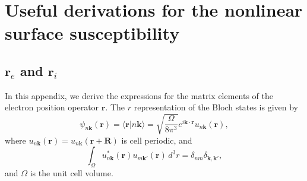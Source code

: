 \chapter{Useful derivations for the nonlinear surface susceptibility}
\label{app:chi2deriv}
\partialtoc



\section{\texorpdfstring{$\mathbf{r}_{e}$ and $\mathbf{r}_{i}$}{re and ri}}
\label{app:re_ri}

In this appendix, we derive the expressions for the matrix elements of the
electron position operator $\mathbf{r}$. The $r$ representation of the Bloch
states is given by
\begin{equation}\label{bloch}
\psi_{n\mathbf{k}}(\mathbf{r})=\langle\mathbf{r}\vert n\mathbf{k}\rangle =
\sqrt{\frac{\Omega}{8\pi^{3}}}
e^{i\mathbf{k} \cdot \mathbf{r}}u_{n\mathbf{k}}(\mathbf{r}),
\end{equation}
where $u_{n\mathbf{k}}(\mathbf{r}) = u_{n\mathbf{k}}(\mathbf{r} + \mathbf{R})$
is cell periodic, and
\begin{equation}\label{normal}
\int_{\Omega}
u_{n\mathbf{k}}^{*}(\mathbf{r})u_{m\mathbf{k}'}(\mathbf{r})\,d^{3}r
= \delta_{nm}\delta_{\mathbf{\mathbf{k},\mathbf{k}'}},
\end{equation}
and $\Omega$ is the unit cell volume.

